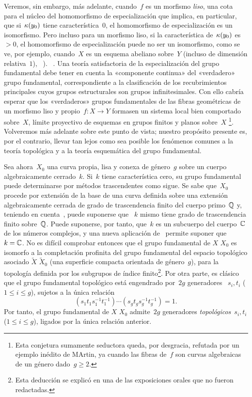 \begin{remarques}
Veremos, sin embargo, más adelante, cuando~$f$ es un morfismo \emph{liso}, una
cota para el núcleo del homomorfismo de especialización que implica, en
particular, que si~$\kappa(y_0)$ tiene característica~0, el homomorfismo de
especialización es un isomorfismo. Pero incluso para un morfismo liso, si la
característica de~$\kappa(y_0)$ es~$>0$, el homomorfismo de especialización
puede no ser un isomorfismo, como se ve, por ejemplo, cuando~$X$ es un esquema
abeliano sobre~$Y$ (incluso de dimensión relativa~$1$),
{\cf~).}
{\cf~.}
Una teoría satisfactoria de la especialización del grupo fundamental debe
tener en cuenta la «componente continua» del «verdadero» grupo fundamental,
correspondiente a la clasificación de los recubrimientos principales cuyos
grupos estructurales son grupos infinitesimales. Con ello cabría esperar que
los «verdaderos» grupos fundamentales de las fibras geométricas de un morfismo
liso y propio~$f\colon X\to Y$ formasen un sistema local bien comportado
sobre~$X$, límite proyectivo de esquemas en grupos finitos y planos sobre~$X$
\kern1pt\footnote{Esta conjetura sumamente seductora queda, por desgracia,
refutada por un ejemplo inédito de M\ptbl Artin, ya cuando las fibras de~$f$
son curvas algebraicas de un género dado~$g\ge 2$.}. Volveremos más adelante
sobre este punto de vista; nuestro propósito presente es, por el contrario,
llevar tan lejos como sea posible los fenómenos comunes a la teoría topológica
y a la teoría esquemática del grupo fundamental.
\end{remarques}

Sea ahora~$X_0$ una curva propia, lisa y conexa de género~$g$ sobre un cuerpo
algebraicamente cerrado~$k$. Si~$k$ tiene característica cero, su grupo
fundamental puede determinarse por métodos trascendentes como sigue. Se sabe
que~$X_0$ procede por extensión de la base de una curva definida
sobre una extensión algebraicamente cerrada de grado de trascendencia finito
del cuerpo primo~$\mathbb Q$ y, teniendo en cuenta~, puede suponerse que
~$k$ mismo tiene grado de trascendencia finito sobre~$\mathbb Q$. Puede suponerse,
por tanto, que~$k$ es un subcuerpo del cuerpo~$\mathbb C$ de los números complejos,
y una nueva aplicación de~ permite suponer que~$k=\mathbb C$. No es
difícil comprobar entonces que el grupo fundamental de
{$X$}
{$X_0$}
es isomorfo a la completación profinita del grupo fundamental del espacio
topológico asociado
{$\tilde X$}
{$\widetilde X_0$}
(una superficie compacta orientada de género~$g$), para la topología definida
por los subgrupos de índice finito\footnote{Esta deducción se explicó en una de
las exposiciones orales que no fueron redactadas.}. Por otra parte, es clásico
que el grupo fundamental topológico está engendrado por~$2g$ generadores
~$s_i,t_i$ ($1\le i\le g$), sujetos a la única relación
$$
(s_1t_1s_1^{-1}t_1^{-1})\cdots(s_gt_gs_g^{-1}t_g^{-1})=1.
$$
Por tanto, el grupo fundamental de
{$X$}
{$X_0$}
admite~$2g$ generadores \emph{topológicos}~$s_i,t_i$ ($1\le i\le g$), ligados
por la única relación anterior.

